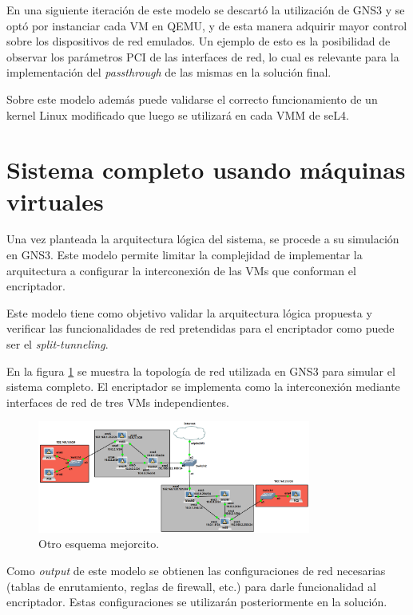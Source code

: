 En una siguiente iteración de este modelo se descartó la utilización de GNS3 y se optó por instanciar cada VM en QEMU, y de esta manera adquirir mayor control sobre los dispositivos de red emulados. Un ejemplo de esto es la posibilidad de observar los parámetros PCI de las interfaces de red, lo cual es relevante para la implementación del \textit{passthrough} de las mismas en la solución final. 

Sobre este modelo además puede validarse el correcto funcionamiento de un kernel Linux modificado que luego se utilizará en cada VMM de seL4.

\section{Sistema completo usando máquinas virtuales}
Una vez planteada la arquitectura lógica del sistema, se procede a su simulación en GNS3. Este modelo permite limitar la complejidad de implementar la arquitectura a configurar la interconexión de las VMs que conforman el encriptador.

Este modelo tiene como objetivo validar la arquitectura lógica propuesta y verificar las funcionalidades de red pretendidas para el encriptador como puede ser el \textit{split-tunneling}.

En la figura \ref{diag:gns3_2} se muestra la topología de red utilizada en GNS3 para simular el sistema completo. El encriptador se implementa como la interconexión mediante interfaces de red de tres VMs independientes.

\begin{figure}[h!]
    \centering
    \includegraphics[width=0.8\textwidth]{../images/gns3_2.png}
    \caption{Otro esquema mejorcito.}
    \label{diag:gns3_2}
\end{figure}

Como \textit{output} de este modelo se obtienen las configuraciones de red necesarias (tablas de enrutamiento, reglas de firewall, etc.) para darle funcionalidad al encriptador. Estas configuraciones se utilizarán posteriormente en la solución.


